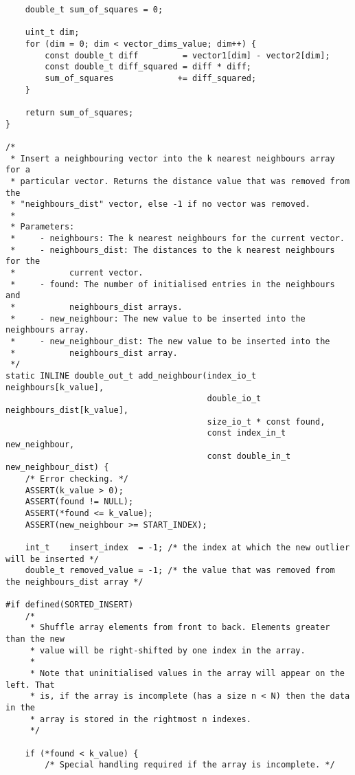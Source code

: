 \begin{lstlisting}
    double_t sum_of_squares = 0;
    
    uint_t dim;
    for (dim = 0; dim < vector_dims_value; dim++) {
        const double_t diff         = vector1[dim] - vector2[dim];
        const double_t diff_squared = diff * diff;
        sum_of_squares             += diff_squared;
    }
    
    return sum_of_squares;
}

/*
 * Insert a neighbouring vector into the k nearest neighbours array for a
 * particular vector. Returns the distance value that was removed from the
 * "neighbours_dist" vector, else -1 if no vector was removed.
 *
 * Parameters:
 *     - neighbours: The k nearest neighbours for the current vector.
 *     - neighbours_dist: The distances to the k nearest neighbours for the
 *           current vector.
 *     - found: The number of initialised entries in the neighbours and
 *           neighbours_dist arrays.
 *     - new_neighbour: The new value to be inserted into the neighbours array.
 *     - new_neighbour_dist: The new value to be inserted into the 
 *           neighbours_dist array.
 */
static INLINE double_out_t add_neighbour(index_io_t neighbours[k_value],
                                         double_io_t neighbours_dist[k_value],
                                         size_io_t * const found,
                                         const index_in_t new_neighbour,
                                         const double_in_t new_neighbour_dist) {
    /* Error checking. */
    ASSERT(k_value > 0);
    ASSERT(found != NULL);
    ASSERT(*found <= k_value);
    ASSERT(new_neighbour >= START_INDEX);
    
    int_t    insert_index  = -1; /* the index at which the new outlier will be inserted */
    double_t removed_value = -1; /* the value that was removed from the neighbours_dist array */
    
#if defined(SORTED_INSERT)
    /*
     * Shuffle array elements from front to back. Elements greater than the new
     * value will be right-shifted by one index in the array.
     *
     * Note that uninitialised values in the array will appear on the left. That
     * is, if the array is incomplete (has a size n < N) then the data in the
     * array is stored in the rightmost n indexes.
     */
    
    if (*found < k_value) {
        /* Special handling required if the array is incomplete. */
        

\end{lstlisting}
